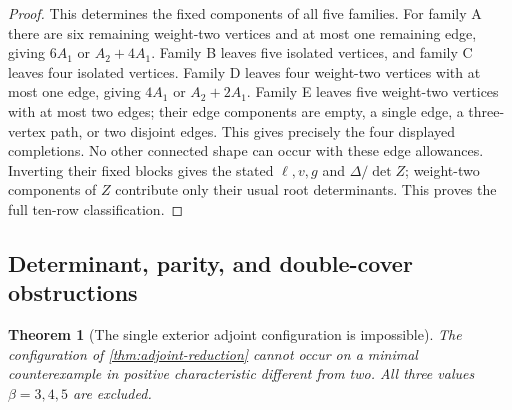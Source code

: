 \documentclass[11pt,reqno]{amsart}
\newtheorem{theorem}{Theorem}[section]
\theoremstyle{definition}
\theoremstyle{remark}
\numberwithin{equation}{section}
\begin{document}
\begin{proof}
This determines the fixed components of all five families.
For family A there are six remaining weight-two vertices and at most
one remaining edge, giving $6A_1$ or $A_2+4A_1$. Family B leaves five
isolated vertices, and family C leaves four isolated vertices.
Family D leaves four weight-two vertices with at most one edge,
giving $4A_1$ or $A_2+2A_1$. Family E leaves five weight-two vertices
with at most two edges; their edge components are empty, a single
edge, a three-vertex path, or two disjoint edges. This gives precisely
the four displayed completions. No other connected shape can occur
with these edge allowances. Inverting their fixed blocks gives the stated $\ell,v,g$ and
$\Delta/\det Z$; weight-two components of $Z$ contribute only their
usual root determinants. This proves the full ten-row classification.
\end{proof}


\subsection{Determinant, parity, and double-cover obstructions}

\begin{theorem}[The single exterior adjoint configuration is impossible]
\label{thm:forest-exclusion}
The configuration of
\cref{thm:adjoint-reduction} cannot occur on a
minimal counterexample in positive characteristic different from two.
All three values $\beta=3,4,5$ are excluded.
\end{theorem}
\end{document}
